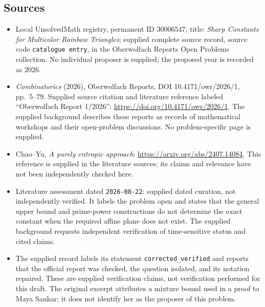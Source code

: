 \documentclass[11pt]{article}
\begin{document}
\subsection{Sources}
\begin{itemize}
\item Local UnsolvedMath registry, permanent ID \(30006547\), title: \emph{Sharp Constants for Multicolor Rainbow Triangles}; supplied complete source record, source code \texttt{catalogue entry}, in the Oberwolfach Reports Open Problems collection. No individual proposer is supplied; the proposed year is recorded as 2026.
\item \emph{Combinatorics} (2026), Oberwolfach Reports, DOI 10.4171/owr/2026/1, pp.\ 5--79. Supplied source citation and literature reference labeled ``Oberwolfach Report 1/2026'': \url{https://doi.org/10.4171/owr/2026/1}. The supplied background describes these reports as records of mathematical workshops and their open-problem discussions. No problem-specific page is supplied.
\item Chao--Yu, \emph{A purely entropic approach}: \url{https://arxiv.org/abs/2407.14084}. This reference is supplied in the literature sources; its claims and relevance have not been independently checked here.
\item Literature assessment dated \texttt{2026-08-22}: supplied dated curation, not independently verified. It labels the problem open and states that the general upper bound and prime-power constructions do not determine the exact constant when the required affine plane does not exist. The supplied background requests independent verification of time-sensitive status and cited claims.
\item The supplied record labels its statement \texttt{corrected\_verified} and reports that the official report was checked, the question isolated, and its notation repaired. These are supplied verification claims, not verification performed for this draft. The original excerpt attributes a mixture bound used in a proof to Maya Sankar; it does not identify her as the proposer of this problem.
\end{itemize}
\end{document}
